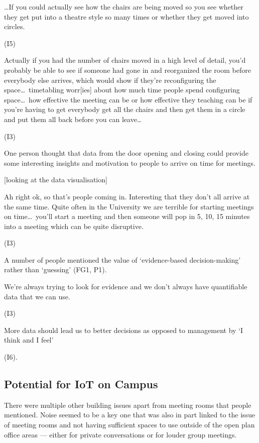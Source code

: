 \begin{qt}\ldots If you could actually see how the chairs are being moved so you see
whether they get put into a theatre style so many times or whether
they get moved into circles.\end{qt} (I5)

\begin{qt}Actually if you had the number of chairs moved in a high level of
detail, you’d probably be able to see if someone had gone in and
reorganized the room before everybody else arrives, which would show
if they’re reconfiguring the space\ldots\  timetabling worr[ies] about how
much time people spend configuring space\ldots\ {}how effective the meeting can
be or how effective they teaching can be if you’re having to get
everybody get all the chairs and then get them in a circle and put
them all back before you can leave\ldots\ {}\end{qt} (I3)

One person thought that data from the door opening and closing could provide
some interesting insights and motivation to people to arrive on time
for meetings.

[looking at the data visualisation] \begin{qt}Ah right ok, so that’s people coming in. Interesting that they don’t
all arrive at the same time. Quite often in the University we are
terrible for starting meetings on time\ldots\  you’ll start a meeting and then someone will pop in
5, 10, 15 minutes into a meeting which can be quite disruptive.\end{qt} (I3)


A number of people mentioned the value of ‘evidence-based decision-making’ rather than ‘guessing’ (FG1, P1).

\begin{qt}We’re always trying to look for evidence and
we don’t always have quantifiable data that we can use.\end{qt} (I3)

\begin{qt}More data should lead us to better decisions as opposed to
  management by ‘I think and I feel’\end{qt} (I6).

\subsection{Potential for IoT on Campus}
\label{sec:potential}

There were multiple other building issues apart from meeting rooms
that people mentioned. Noise seemed to be a key one that was also in
part linked to the issue of meeting rooms and not having sufficient
spaces to use outside of the open plan office areas --- either for
private conversations or for louder group meetings.

